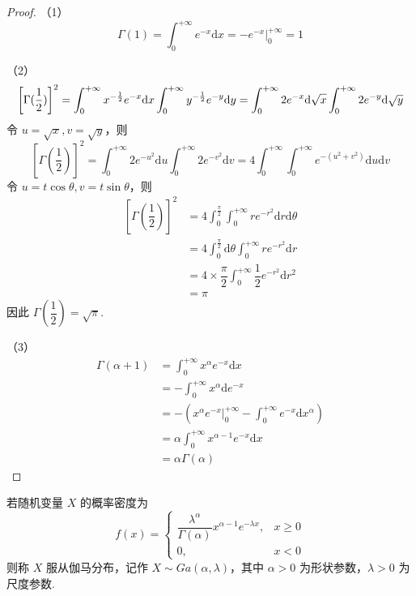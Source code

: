 \begin{proof}
    （1）
    $$
    \Gamma(1) = \int_{0}^{+\infty} e^{-x} \text{d}x = -e^{-x} \Big|_0^{+\infty} = 1
    $$

    （2）
    $$
    \left[ \Gamma(\dfrac{1}{2}) \right]^2 = \int_{0}^{+\infty} x^{-\frac{1}{2}} e^{-x} \text{d}x \int_{0}^{+\infty} y^{-\frac{1}{2}} e^{-y} \text{d}y = \int_{0}^{+\infty} 2 e^{-x} \text{d} \sqrt{x} \int_{0}^{+\infty} 2 e^{-y} \text{d} \sqrt{y} \\
    $$
    令 $u = \sqrt{x}, v = \sqrt{y}$，则
    $$
    \left[ \Gamma(\dfrac{1}{2}) \right]^2 = \int_{0}^{+\infty} 2 e^{-u^2} \text{d}u \int_{0}^{+\infty} 2 e^{-v^2} \text{d}v = 4 \int_{0}^{+\infty} \int_{0}^{+\infty} e^{-(u^2 + v^2)} \text{d}u \text{d}v
    $$
    令 $u = t \cos\theta, v = t \sin\theta$，则
    $$
    \begin{aligned}
        \left[ \Gamma(\dfrac{1}{2}) \right]^2 &= 4 \int_{0}^{\frac{\pi}{2}} \int_{0}^{+\infty} r e^{-r^2} \text{d}r \text{d} \theta \\
        &= 4 \int_{0}^{\frac{\pi}{2}} \text{d} \theta \int_{0}^{+\infty} r e^{-r^2} \text{d}r \\
        &= 4 \times \dfrac{\pi}{2} \int_{0}^{+\infty} \dfrac{1}{2} e^{-r^2} \text{d}r^2 \\
        &= \pi
    \end{aligned}
    $$
    因此 $\Gamma(\dfrac{1}{2}) = \sqrt{\pi}$.

    （3）
    $$
    \begin{aligned}
        \Gamma(\alpha + 1) &= \int_{0}^{+\infty} x^{\alpha} e^{-x} \text{d}x \\
        &= -\int_{0}^{+\infty} x^{\alpha} \text{d} e^{-x} \\
        &= -\left( x^{\alpha} e^{-x} \Big|_0^{+\infty} - \int_{0}^{+\infty} e^{-x} \text{d} x^{\alpha} \right) \\
        &= \alpha \int_{0}^{+\infty} x^{\alpha - 1} e^{-x} \text{d}x \\
        &= \alpha \Gamma(\alpha)
    \end{aligned}
    $$

    \vspace{-2em}
\end{proof}

\begin{definition}
    \indent 若随机变量 $X$ 的概率密度为
    $$
    f(x) = \begin{cases}
        \dfrac{\lambda^\alpha}{\Gamma(\alpha)} x^{\alpha - 1} e^{-\lambda x}, & x \geqslant 0 \\[0.5em]
        0, & x<0
    \end{cases}
    $$
    则称 $X$ 服从{\heiti 伽马分布}，记作 $X \sim Ga(\alpha,\lambda)$，其中 $\alpha > 0$ 为{\heiti 形状参数}，$\lambda > 0$ 为{\heiti 尺度参数}.
\end{definition}

